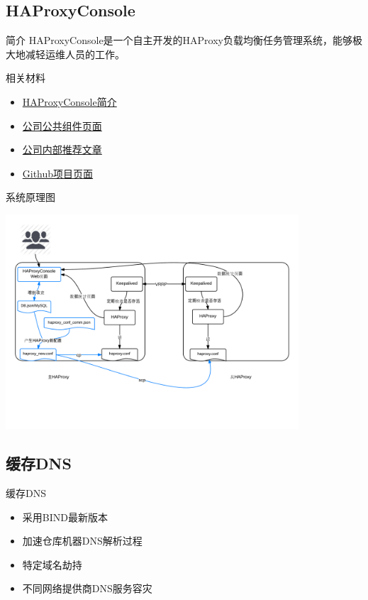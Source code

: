 \documentclass[CJK]{beamer}
\begin{document}
\begin{CJK*}{UTF8}{gbsn}
\subsection{HAProxyConsole}
\begin{frame}{简介}
HAProxyConsole是一个自主开发的HAProxy负载均衡任务管理系统，能够极大地减轻运维人员的工作。
\begin{block}{相关材料}
\begin{itemize}
\item \href{http://youngsterxyf.github.io/2013/12/02/re_introduce_haproxyconsole/}{HAProxyConsole简介}
\item \href{http://pub.code.oa.com/project/home?projectName=HAProxyConsole}{公司公共组件页面}
\item \href{http://km.oa.com/group/geek/articles/show/172179}{公司内部推荐文章}
\item \href{https://github.com/youngsterxyf/haproxyconsole}{Github项目页面}
\end{itemize}
\end{block}
\end{frame}
\begin{frame}{系统原理图}
\begin{center}
\includegraphics[height=8cm]{HAProxyConsole-arch.png}
\end{center}
\end{frame}

\subsection{缓存DNS}
\begin{frame}{缓存DNS}
\begin{itemize}
\item 采用BIND最新版本
\item 加速仓库机器DNS解析过程
\item 特定域名劫持
\item 不同网络提供商DNS服务容灾
\end{itemize}
\end{frame}


\end{CJK*}
\end{document}
